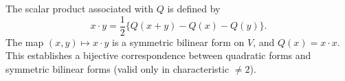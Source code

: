 The scalar product associated with $Q$ is defined by
$$x \cdot y = \frac{1}{2}\{Q(x+y) - Q(x) - Q(y)\}.$$
The map $(x,y) \mapsto x \cdot y$ is a symmetric bilinear form on $V$, and $Q(x) = x \cdot x$. This establishes a bijective correspondence between quadratic forms and symmetric bilinear forms (valid only in characteristic $\neq 2$).
